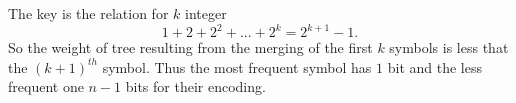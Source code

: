 \documentclass[a4paper,12pt]{article}
\begin{document}
The key is the relation for $k$ integer
\[ 1 + 2 + 2^2 + ... + 2^k = 2^{k+1} - 1.\]
So the weight of tree resulting from the merging of the first $k$
symbols is less that the $(k+1)^{th}$ symbol.  Thus the most frequent
symbol has $1$ bit and the less frequent one $n-1$ bits for their encoding.
\end{document}
